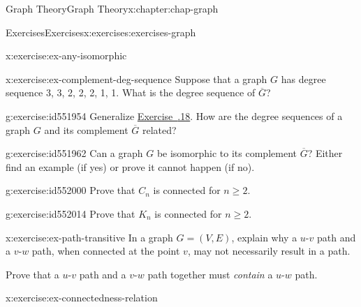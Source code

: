 \documentclass[oneside,10pt,]{book}
\newcommand{\xreffont}{\relax}
\numberwithin{equation}{section}
\begin{document}
\begin{chapterptx}{Graph Theory}{}{Graph Theory}{}{}{x:chapter:chap-graph}
\begin{exercises-section}{Exercises}{}{Exercises}{}{}{x:exercises:exercises-graph}
\begin{divisionexercise}{17}{}{}{x:exercise:ex-any-isomorphic}
\begin{sidebyside}{4}{0.015}{0.015}{0.03}
\begin{sbspanel}{0.22}
{
}%
\end{sbspanel}%
\end{sidebyside}%
\end{divisionexercise}%
\begin{divisionexercise}{18}{}{}{x:exercise:ex-complement-deg-sequence}%
Suppose that a graph \(G\) has degree sequence 3, 3, 2, 2, 2, 1, 1. What is the degree sequence of \(\overline{G}\)?%
\end{divisionexercise}%
\begin{divisionexercise}{19}{}{}{g:exercise:id551954}%
Generalize \hyperlink{x:exercise:ex-complement-deg-sequence}{Exercise~{\xreffont 5.8.18}}. How are the degree sequences of a graph \(G\) and its complement \(\overline{G}\) related?%
\end{divisionexercise}%
\begin{divisionexercise}{20}{}{}{g:exercise:id551962}%
Can a graph \(G\) be isomorphic to its complement \(\overline{G}\)? Either find an example (if yes) or prove it cannot happen (if no).%
\end{divisionexercise}%
\begin{divisionexercise}{21}{}{}{g:exercise:id552000}%
Prove that \(C_n\) is connected for \(n \geq 2\).%
\end{divisionexercise}%
\begin{divisionexercise}{22}{}{}{g:exercise:id552014}%
Prove that \(K_n\) is connected for \(n \geq 2\).%
\end{divisionexercise}%
\begin{divisionexercise}{23}{}{}{x:exercise:ex-path-transitive}%
In a graph \(G = (V,E)\), explain why a \(u\)-\(v\) path and a \(v\)-\(w\) path, when connected at the point \(v\), may not necessarily result in a path.%
\par
Prove that a \(u\)-\(v\) path and a \(v\)-\(w\) path together must \emph{contain} a \(u\)-\(w\) path.%
\end{divisionexercise}%
\begin{divisionexercise}{24}{}{}{x:exercise:ex-connectedness-relation}%

\end{divisionexercise}
\end{exercises-section}
\end{chapterptx}
\end{document}
